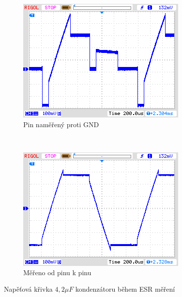 \begin{figure}[H]
  \begin{subfigure}[b]{.5\textwidth}
    \centering
    \includegraphics[width=1.\textwidth]{../PNG/ESR_4uF.png}
    \caption{Pin naměřený proti GND}
  \end{subfigure}
  ~
  \begin{subfigure}[b]{.5\textwidth}
    \centering
    \includegraphics[width=1.\textwidth]{../PNG/ESR4uF6R8.png}
    \caption{Měřeno od pinu k pinu}
  \end{subfigure}
  \caption{Napěťová křivka \(4,2\mu F\) kondenzátoru během ESR měření}
  \label{pic:esr4}
\end{figure}

